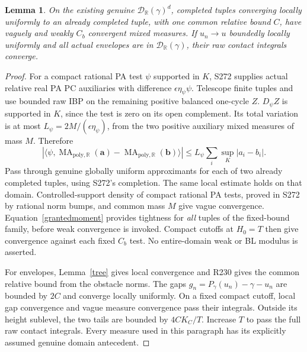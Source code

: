 \documentclass[11pt]{article}
\newtheorem{lemma}[theorem]{Lemma}
\newcommand{\R}{\mathbb R}
\newcommand{\MA}{\operatorname{MA}_{\mathrm{poly},\R}}
\newcommand{\D}{\mathcal D_\R(\gamma)}
\begin{document}
\begin{lemma}\label{localma}
On the existing genuine $\D^d$, completed tuples converging locally
uniformly to an already completed tuple, with one common relative
bound $C$, have vaguely and weakly $C_b$ convergent mixed measures.
If $u_n\to u$ boundedly locally uniformly and all actual envelopes
are in $\D$, their raw contact integrals converge.
\end{lemma}
\begin{proof}
For a compact rational PA test $\psi$ supported in $K$, S272 supplies
actual relative real PA PC auxiliaries with difference
$\epsilon\eta_\psi\psi$. Telescope finite tuples and use bounded
raw IBP on the remaining positive balanced one-cycle $Z$.
$D_\psi Z$ is supported in $K$, since the test is zero on its open
complement. Its total variation is at most
$L_\psi=2M/(\epsilon\eta_\psi)$, from the two positive auxiliary
mixed measures of mass $M$. Therefore
\[
 |\langle\psi,\MA(\mathbf a)-\MA(\mathbf b)\rangle|
 \leq L_\psi\sum_i\sup_K|a_i-b_i|.
\]
Pass through genuine globally uniform approximants for each of two
already completed tuples, using S272's completion. The same local
estimate holds on that domain. Controlled-support density of compact
rational PA tests, proved in S272 by rational norm bumps, and common
mass $M$ give vague convergence. Equation~\eqref{grantedmoment}
provides tightness for \emph{all} tuples of the fixed-bound family,
before weak convergence is invoked. Compact cutoffs at $H_0=T$
then give convergence against each fixed $C_b$ test. No entire-domain
weak or BL modulus is asserted.

For envelopes, Lemma~\ref{tree} gives local convergence and R230
gives the common relative bound from the obstacle norms. The gaps
$g_n=P_\gamma(u_n)-\gamma-u_n$ are bounded by $2C$ and converge
locally uniformly. On a fixed compact cutoff, local gap convergence
and vague measure convergence pass their integrals. Outside its
height sublevel, the two tails are bounded by $4CK_C/T$. Increase
$T$ to pass the full raw contact integrals. Every measure used in
this paragraph has its explicitly assumed genuine domain antecedent.
\end{proof}
\end{document}
